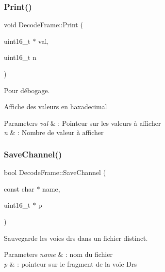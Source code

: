 \subsubsection{\texorpdfstring{Print()}{Print()}}
{\footnotesize\ttfamily void Decode\+Frame\+::\+Print (\begin{DoxyParamCaption}\item[{uint16\+\_\+t $\ast$}]{val,  }\item[{uint16\+\_\+t}]{n }\end{DoxyParamCaption})}



Pour débogage. 

Affiche des valeurs en haxadecimal 
\begin{DoxyParams}{Parameters}
{\em val} & \+: Pointeur sur les valeurs à afficher \\
\hline
{\em n} & \+: Nombre de valeur à afficher \\
\hline
\end{DoxyParams}
\mbox{\label{classDecodeFrame_a8bf6c842a468a6b43ff3c6bc8b184924}} 
\subsubsection{\texorpdfstring{Save\+Channel()}{SaveChannel()}}
{\footnotesize\ttfamily bool Decode\+Frame\+::\+Save\+Channel (\begin{DoxyParamCaption}\item[{const char $\ast$}]{name,  }\item[{uint16\+\_\+t $\ast$}]{p }\end{DoxyParamCaption})}



Sauvegarde les voies drs dans un fichier distinct. 


\begin{DoxyParams}{Parameters}
{\em name} & \+: nom du fichier \\
\hline
{\em p} & \+: pointeur sur le fragment de la voie Drs \\
\hline
\end{DoxyParams}
\mbox{\label{classDecodeFrame_a61d74f8bd0886b27356a4431999049ae}} 

